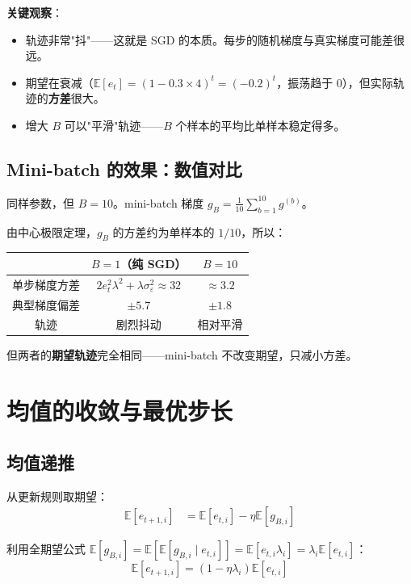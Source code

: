 \documentclass[12pt, a4paper]{ctexart}
\begin{document}
\textbf{关键观察}：
\begin{itemize}
    \item 轨迹非常"抖"——这就是 SGD 的本质。每步的随机梯度与真实梯度可能差很远。
    \item 期望在衰减（$\mathbb{E}[e_t] = (1-0.3\times 4)^t = (-0.2)^t$，振荡趋于 0），但实际轨迹的\textbf{方差}很大。
    \item 增大 $B$ 可以"平滑"轨迹——$B$ 个样本的平均比单样本稳定得多。
\end{itemize}

\subsection{Mini-batch 的效果：数值对比}

同样参数，但 $B = 10$。mini-batch 梯度 $g_{B} = \frac{1}{10}\sum_{b=1}^{10} g^{(b)}$。

由中心极限定理，$g_B$ 的方差约为单样本的 $1/10$，所以：

\begin{center}
\begin{tabular}{c|cc}
& $B=1$（纯 SGD） & $B=10$ \\
\hline
单步梯度方差 & $2e_t^2\lambda^2 + \lambda\sigma_\varepsilon^2 \approx 32$ & $\approx 3.2$ \\
典型梯度偏差 & $\pm 5.7$ & $\pm 1.8$ \\
轨迹 & 剧烈抖动 & 相对平滑 \\
\end{tabular}
\end{center}

但两者的\textbf{期望轨迹}完全相同——mini-batch 不改变期望，只减小方差。


\section{均值的收敛与最优步长}

\subsection{均值递推}

从更新规则取期望：
\begin{align}
    \mathbb{E}[e_{t+1,i}] &= \mathbb{E}[e_{t,i}] - \eta \mathbb{E}[g_{B,i}]
\end{align}

利用全期望公式 $\mathbb{E}[g_{B,i}] = \mathbb{E}[\mathbb{E}[g_{B,i} \mid e_{t,i}]] = \mathbb{E}[e_{t,i} \lambda_i] = \lambda_i \mathbb{E}[e_{t,i}]$：
\begin{equation}
    \mathbb{E}[e_{t+1,i}] = (1 - \eta\lambda_i) \mathbb{E}[e_{t,i}]
\end{equation}
\end{document}
